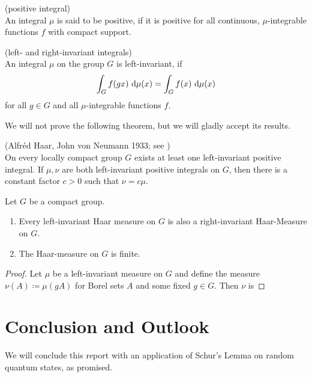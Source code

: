 \documentclass[a4paper,11pt, BCOR=4mm, DIV=12, pagesize]{scrartcl}
\begin{document}
\begin{definition}(positive integral)\\
An integral $\mu$ is said to be positive, if it is positive for all 
continuous, $\mu$-integrable functions $f$ with compact support.
\end{definition}


\begin{definition} (left- and right-invariant integrals)\\
 An integral $\mu$ on the group $G$ is left-invariant, if 
 \begin{equation}
  \int_G f(gx)\ \mathrm{d}\mu(x) = \int_G f(x)\ \mathrm{d}\mu(x)
 \end{equation}
 for all $g\in G$ and all $\mu$-integrable functions $f$.
\end{definition}

We will not prove the following theorem, but we will gladly accept its 
results.
\begin{thm} (Alfr\'ed Haar, John von Neumann 1933; see \cite{haar})\\
 On every locally compact group $G$ exists at least one left-invariant positive 
integral. If $\mu,\nu$ are both left-invariant positive integrals on $G$, then 
there is a constant factor $c>0$ such that $\nu = c\mu$.
\end{thm}

\begin{cor}
Let $G$ be a compact group.
\begin{enumerate}\renewcommand{\labelenumi}{(\alph{enumi})}
 \item Every left-invariant Haar measure on $G$ is also a right-invariant 
Haar-Measure on $G$. 
 \item The Haar-measure on $G$ is finite.
 \end{enumerate}
\end{cor}
\begin{proof}
 Let $\mu$ be a left-invariant measure on $G$ and define the 
measure $\nu(A)\coloneqq \mu(gA)$ for Borel sets $A$ and some fixed $g\in G$. 
Then $\nu$ is \todo
\end{proof}



\section{Conclusion and Outlook}
We will conclude this report with an application of Schur's Lemma on random 
quantum states, as promised. 
\end{document}

